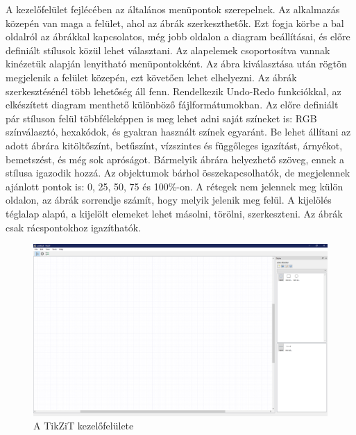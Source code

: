 \noindent
A kezelőfelület fejlécében az általános menüpontok szerepelnek. Az alkalmazás közepén van maga a felület, ahol az ábrák szerkeszthetők. Ezt fogja körbe a bal oldalról az ábrákkal kapcsolatos, még jobb oldalon a diagram beállításai, és előre definiált stílusok közül lehet választani. Az alapelemek csoportosítva vannak kinézetük alapján lenyitható menüpontokként. Az ábra kiválasztása után rögtön megjelenik a felület közepén, ezt követően lehet elhelyezni. Az ábrák szerkesztésénél több lehetőség áll fenn. Rendelkezik Undo-Redo funkciókkal, az elkészített diagram menthető különböző fájlformátumokban. Az előre definiált pár stíluson felül többféleképpen is meg lehet adni saját színeket is: RGB színválasztó, hexakódok, és gyakran használt színek egyaránt. Be lehet állítani az adott ábrára kitöltőszínt, betűszínt, vízszintes és függőleges igazítást, árnyékot, bemetszést, és még sok apróságot. Bármelyik ábrára helyezhető szöveg, ennek a stílusa igazodik hozzá. Az objektumok bárhol összekapcsolhatók, de megjelennek ajánlott pontok is: 0, 25, 50, 75 és 100\%-on. A rétegek nem jelennek meg külön oldalon, az ábrák sorrendje számít, hogy melyik jelenik meg felül. A kijelölés téglalap alapú, a kijelölt elemeket lehet másolni, törölni, szerkeszteni. Az ábrák csak rácspontokhoz igazíthatók.


\begin{figure}[!h]
	\includegraphics[width=\textwidth]{images/tikzit.png}
	\caption{A TikZiT kezelőfelülete \cite{tikzit}}
	\label{fig:tikzit}
\end{figure}

